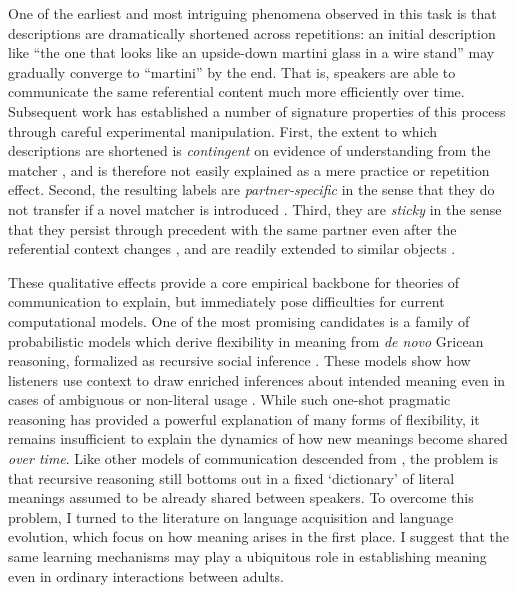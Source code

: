 \documentclass[11pt]{article}
\begin{document}
One of the earliest and most intriguing phenomena observed in this task is that descriptions are dramatically shortened across repetitions: an initial description like ``the one that looks like an upside-down martini glass in a wire stand'' may gradually converge to ``martini'' by the end.
That is, speakers are able to communicate the same referential content much more efficiently over time.
Subsequent work has established a number of signature properties of this process through careful experimental manipulation.
First, the extent to which descriptions are shortened is \emph{contingent} on evidence of understanding from the matcher , and is therefore not easily explained as a mere practice or repetition effect.
Second, the resulting labels are \emph{partner-specific} in the sense that they do not transfer if a novel matcher is introduced .
Third, they are \emph{sticky} in the sense that they persist through precedent with the same partner even after the referential context changes \cite{BrennanClark96_ConceptualPactsConversation}, and are readily extended to similar objects \cite{MarkmanMakin98_ReferentialCommunicationCategory}.

These qualitative effects provide a core empirical backbone for theories of communication to explain, but immediately pose difficulties for current computational models.
One of the most promising candidates is a family of probabilistic models which derive flexibility in meaning from \emph{de novo} Gricean reasoning, formalized as recursive social inference \cite{GoodmanFrank16_RSATiCS,FrankeJager16_ProbabilisticPragmatics}.
These models show how listeners use context to draw enriched inferences about intended meaning even in cases of ambiguous or non-literal usage \cite{Clark83_NonceSense,LascaridesCopestake98_PragmaticsWordMeaning,Glucksberg01_FigurativeLanguage}.
While such one-shot pragmatic reasoning has provided a powerful explanation of many forms of flexibility, it remains insufficient to explain the dynamics of how new meanings become shared \emph{over time}.
Like other models of communication descended from , the problem is that recursive reasoning still bottoms out in a fixed  `dictionary' of literal meanings assumed to be already shared between speakers.
To overcome this problem, I turned to the literature on language acquisition and language evolution, which focus on how meaning arises in the first place.
I suggest that the same learning mechanisms may play a ubiquitous role in establishing meaning even in ordinary interactions between adults. 
\end{document}
